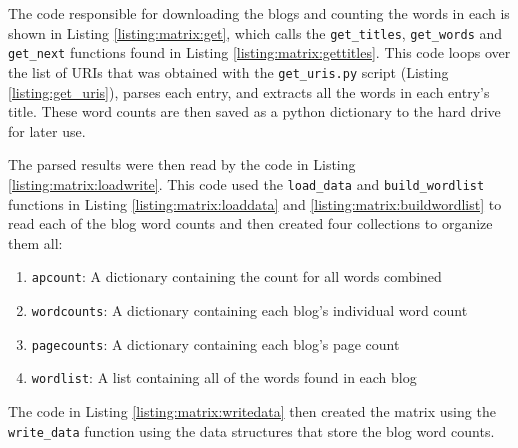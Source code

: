 The code responsible for downloading the blogs and counting the words in each is shown in Listing \ref{listing:matrix:get}, which calls the {\tt get\_titles}, {\tt get\_words} and {\tt get\_next} functions found in Listing \ref{listing:matrix:gettitles}. This code loops over the list of URIs that was obtained with the {\tt get\_uris.py} script (Listing \ref{listing:get_uris}), parses each entry, and extracts all the words in each entry's title. These word counts are then saved as a python dictionary to the hard drive for later use. 



\clearpage



The parsed results were then read by the code in Listing \ref{listing:matrix:loadwrite}. This code used the {\tt load\_data} and {\tt build\_wordlist} functions in Listing \ref{listing:matrix:loaddata} and \ref{listing:matrix:buildwordlist} to read each of the blog word counts and then created four collections to organize them all:

\begin{enumerate}
	\item {\tt apcount}: A dictionary containing the count for all words combined
	\item {\tt wordcounts}: A dictionary containing each blog's individual word count
	\item {\tt pagecounts}: A dictionary containing each blog's page count
	\item {\tt wordlist}: A list containing all of the words found in each blog
\end{enumerate}



\clearpage





The code in Listing \ref{listing:matrix:writedata} then created the matrix using the {\tt write\_data} function using the data structures that store the blog word counts.

